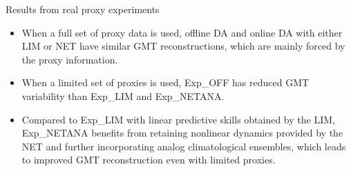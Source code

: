 \documentclass[final]{beamer}
\newlength{\colwidth}
\begin{document}
\begin{frame}[t]
\begin{columns}[t]
\begin{column}{\colwidth}
    			\begin{alertblock}{Results from real proxy experiments}
                    \begin{itemize}
                        \item When a full set of proxy data is used, offline DA and online DA with either LIM or NET have similar GMT reconstructions, which are mainly forced by the proxy information.
                        \item When a limited set of proxies is used, Exp\_OFF has reduced GMT variability than Exp\_LIM and Exp\_NETANA.   
                        \item Compared to Exp\_LIM with linear predictive skills obtained by the LIM, Exp\_NETANA benefits from retaining nonlinear dynamics provided by the NET and further incorporating analog climatological ensembles, which leads to improved GMT reconstruction even with limited proxies.
                    \end{itemize}
                    \begin{figure}
                        \begin{minipage}[t]{0.8\textwidth}
                            \centering
                            \begin{minipage}[t]{0.49\textwidth}
\end{minipage}
\end{minipage}
\end{figure}
\end{alertblock}
\end{column}
\end{columns}
\end{frame}
\end{document}
